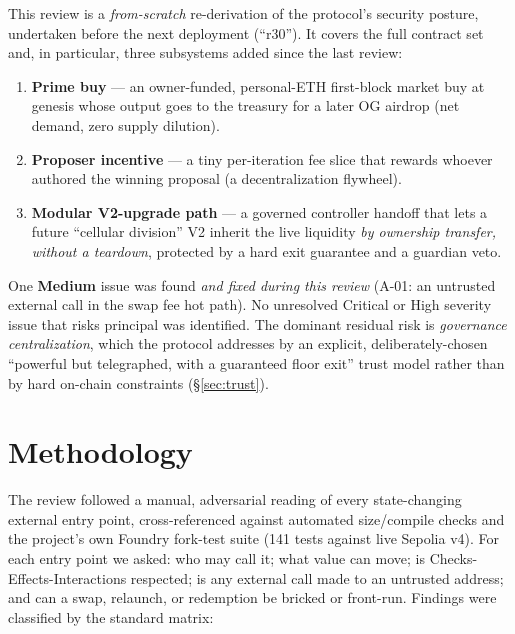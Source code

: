\documentclass[11pt]{article}
\newcommand{\sev}[2]{\textcolor{#1}{\textbf{#2}}}
\begin{document}
This review is a \emph{from-scratch} re-derivation of the protocol's security posture,
undertaken before the next deployment (``r30''). It covers the full contract set and, in
particular, three subsystems added since the last review:

\begin{enumerate}[leftmargin=1.4em]
  \item \textbf{Prime buy} — an owner-funded, personal-ETH first-block market buy at
        genesis whose output goes to the treasury for a later OG airdrop (net demand,
        zero supply dilution).
  \item \textbf{Proposer incentive} — a tiny per-iteration fee slice that rewards whoever
        authored the winning proposal (a decentralization flywheel).
  \item \textbf{Modular V2-upgrade path} — a governed controller handoff that lets a
        future ``cellular division'' V2 inherit the live liquidity \emph{by ownership
        transfer, without a teardown}, protected by a hard exit guarantee and a guardian
        veto.
\end{enumerate}

One \sev{sevMed}{Medium} issue was found \emph{and fixed during this review}
(A-01: an untrusted external call in the swap fee hot path). No unresolved Critical or
High severity issue that risks principal was identified. The dominant residual risk is
\emph{governance centralization}, which the protocol addresses by an explicit,
deliberately-chosen ``powerful but telegraphed, with a guaranteed floor exit'' trust
model rather than by hard on-chain constraints (\S\ref{sec:trust}).

\section{Methodology}

The review followed a manual, adversarial reading of every state-changing external entry
point, cross-referenced against automated size/compile checks and the project's own
Foundry fork-test suite (141 tests against live Sepolia v4). For each entry point we asked:
who may call it; what value can move; is Checks-Effects-Interactions respected; is any
external call made to an untrusted address; and can a swap, relaunch, or redemption be
bricked or front-run. Findings were classified by the standard matrix:
\end{document}
